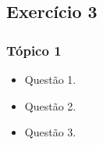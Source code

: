 \subsection[Exercício 3]{Exercício 3}\label{subsec:exercicio-3}



\begin{frame}[t]\frametitle{Tópico 1}

\begin{itemize}
  \justifying{}
  \setlength\itemsep{1em}
  \item Questão 1.
  \item Questão 2.
  \item Questão 3.
\end{itemize}

\end{frame}

